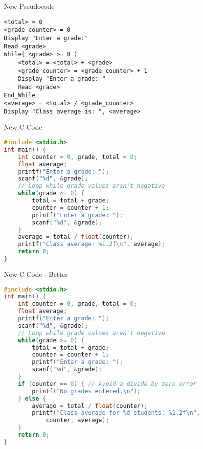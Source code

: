 \documentclass[graphics]{beamer}
\begin{document}
\begin{frame}[fragile]{New Pseudocode}
\begin{verbatim}
<total> = 0
<grade_counter> = 0
Display "Enter a grade:"
Read <grade>
While( <grade> >= 0 )
    <total> = <total> + <grade>
    <grade_counter> = <grade_counter> + 1
    Display "Enter a grade: "
    Read <grade>
End_While
<average> = <total> / <grade_counter>
Display "Class average is: ", <average>
\end{verbatim}
\end{frame}

\begin{frame}[fragile]{New C Code}
\begin{lstlisting}[language=C,basicstyle=\footnotesize,keywordstyle=\color{blue},commentstyle=\color{green},showstringspaces=false,stringstyle=\color{red}]
#include <stdio.h>
int main() {
    int counter = 0, grade, total = 0;
    float average;
    printf("Enter a grade: ");
    scanf("%d", &grade);
    // Loop while grade values aren't negative
    while(grade >= 0) {
        total = total + grade;
        counter = counter + 1;
        printf("Enter a grade: ");
        scanf("%d", &grade);
    }
    average = total / float(counter);
    printf("Class average: %1.2f\n", average);
    return 0;
}
\end{lstlisting}
\end{frame}

\begin{frame}[fragile]{New C Code - Better}
\begin{lstlisting}[language=C,basicstyle=\footnotesize,keywordstyle=\color{blue},commentstyle=\color{green},showstringspaces=false,stringstyle=\color{red}]
#include <stdio.h>
int main() {
    int counter = 0, grade, total = 0;
    float average;
    printf("Enter a grade: ");
    scanf("%d", &grade);
    // Loop while grade values aren't negative
    while(grade >= 0) {
        total = total + grade;
        counter = counter + 1;
        printf("Enter a grade: ");
        scanf("%d", &grade);
    }
    if (counter == 0) { // Avoid a divide by zero error
        printf("No grades entered.\n");
    } else {
        average = total / float(counter);
        printf("Class average for %d students: %1.2f\n",
            counter, average);
    }
    return 0;
}
\end{lstlisting}
\end{frame}
\end{document}
